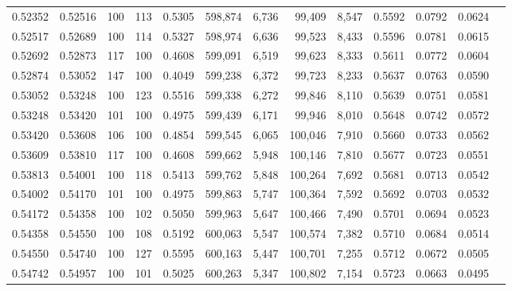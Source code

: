 \begin{tabular}{rrrrrrrrrrrrr}
0.52352 & 0.52516 &   100 & 113 &                                     0.5305 & 598,874 &   6,736 &  99,409 &   8,547 & 0.5592 & 0.0792 & 0.0624 \\
0.52517 & 0.52689 &   100 & 114 &                                     0.5327 & 598,974 &   6,636 &  99,523 &   8,433 & 0.5596 & 0.0781 & 0.0615 \\
0.52692 & 0.52873 &   117 & 100 &                                     0.4608 & 599,091 &   6,519 &  99,623 &   8,333 & 0.5611 & 0.0772 & 0.0604 \\
0.52874 & 0.53052 &   147 & 100 &                                     0.4049 & 599,238 &   6,372 &  99,723 &   8,233 & 0.5637 & 0.0763 & 0.0590 \\
0.53052 & 0.53248 &   100 & 123 &                                     0.5516 & 599,338 &   6,272 &  99,846 &   8,110 & 0.5639 & 0.0751 & 0.0581 \\
0.53248 & 0.53420 &   101 & 100 &                                     0.4975 & 599,439 &   6,171 &  99,946 &   8,010 & 0.5648 & 0.0742 & 0.0572 \\
0.53420 & 0.53608 &   106 & 100 &                                     0.4854 & 599,545 &   6,065 & 100,046 &   7,910 & 0.5660 & 0.0733 & 0.0562 \\
0.53609 & 0.53810 &   117 & 100 &                                     0.4608 & 599,662 &   5,948 & 100,146 &   7,810 & 0.5677 & 0.0723 & 0.0551 \\
0.53813 & 0.54001 &   100 & 118 &                                     0.5413 & 599,762 &   5,848 & 100,264 &   7,692 & 0.5681 & 0.0713 & 0.0542 \\
0.54002 & 0.54170 &   101 & 100 &                                     0.4975 & 599,863 &   5,747 & 100,364 &   7,592 & 0.5692 & 0.0703 & 0.0532 \\
0.54172 & 0.54358 &   100 & 102 &                                     0.5050 & 599,963 &   5,647 & 100,466 &   7,490 & 0.5701 & 0.0694 & 0.0523 \\
0.54358 & 0.54550 &   100 & 108 &                                     0.5192 & 600,063 &   5,547 & 100,574 &   7,382 & 0.5710 & 0.0684 & 0.0514 \\
0.54550 & 0.54740 &   100 & 127 &                                     0.5595 & 600,163 &   5,447 & 100,701 &   7,255 & 0.5712 & 0.0672 & 0.0505 \\
0.54742 & 0.54957 &   100 & 101 &                                     0.5025 & 600,263 &   5,347 & 100,802 &   7,154 & 0.5723 & 0.0663 & 0.0495 \\

\end{tabular}
